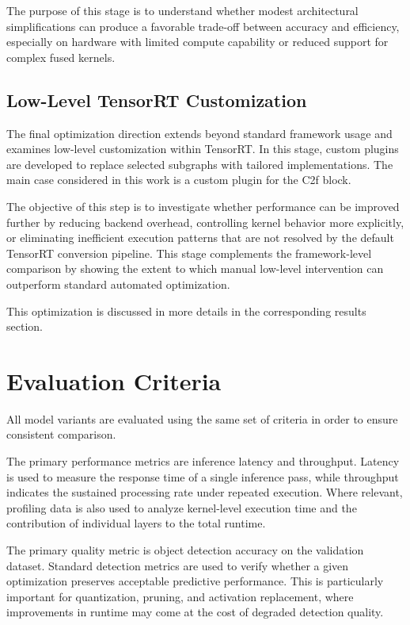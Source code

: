 \documentclass[12pt,a4paper]{report}
\begin{document}
The purpose of this stage is to understand whether modest architectural simplifications can produce a favorable
trade-off between accuracy and efficiency, especially on hardware with limited compute capability or reduced support
for complex fused kernels.

\subsection{Low-Level TensorRT Customization}

The final optimization direction extends beyond standard framework usage and examines low-level customization within
TensorRT. In this stage, custom plugins are developed to replace selected subgraphs with tailored implementations. The
main case considered in this work is a custom plugin for the C2f block.

The objective of this step is to investigate whether performance can be improved further by reducing backend overhead,
controlling kernel behavior more explicitly, or eliminating inefficient execution patterns that are not resolved by the
default TensorRT conversion pipeline. This stage complements the framework-level comparison by showing the extent to
which manual low-level intervention can outperform standard automated optimization.

This optimization is discussed in more details in the corresponding results section.

\section{Evaluation Criteria}

All model variants are evaluated using the same set of criteria in order to ensure consistent comparison.

The primary performance metrics are inference latency and throughput. Latency is used to measure the response time of
a single inference pass, while throughput indicates the sustained processing rate under repeated execution. Where
relevant, profiling data is also used to analyze kernel-level execution time and the contribution of individual
layers to the total runtime.

The primary quality metric is object detection accuracy on the validation dataset. Standard detection metrics are
used to verify whether a given optimization preserves acceptable predictive performance. This is particularly important
for quantization, pruning, and activation replacement, where improvements in runtime may come at the cost of degraded
detection quality.
\end{document}
